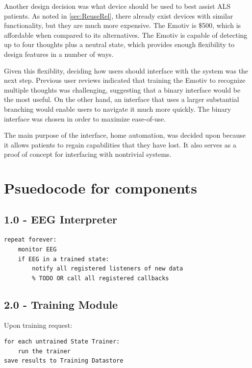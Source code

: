 \documentclass{article}
\begin{document}
Another design decision was what device should be used to best assist ALS
patients. As noted in \autoref{sec:ReuseRel}, there already exist devices with
similar functionality, but they are much more expensive. The Emotiv is \$500,
which is affordable when compared to its alternatives. The Emotiv is capable
of detecting up to four thoughts plus a neutral state, which provides enough
flexibility to design features in a number of ways.

Given this flexiblity, deciding how users should interface with the system was
the next step. Previous user reviews indicated that training the Emotiv to
recognize multiple thoughts was challenging, suggesting that a binary
interface would be the most useful. On the other hand, an interface that uses
a larger substantial branching would enable users to navigate it much more
quickly. The binary interface was chosen in order to maximize ease-of-use.

The main purpose of the interface, home automation, was decided upon because
it allows patients to regain capabilities that they have lost. It also
serves as a proof of concept for interfacing with nontrivial systems.

\newpage

\section{Psuedocode for components}

\subsection*{1.0 - EEG Interpreter}

\begin{lstlisting}
repeat forever:
    monitor EEG
    if EEG in a trained state:
        notify all registered listeners of new data
        % TODO OR call all registered callbacks
\end{lstlisting}

\subsection*{2.0 - Training Module}

Upon training request:

\begin{lstlisting}
for each untrained State Trainer:
    run the trainer
save results to Training Datastore
\end{lstlisting}
\end{document}
